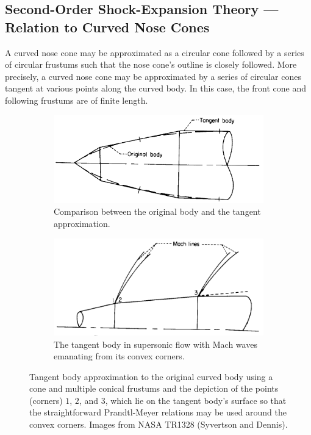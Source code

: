 \documentclass[11pt,dvipsnames]{thesis}
\begin{document}



\subsection{Second-Order Shock-Expansion Theory --- Relation to Curved Nose Cones}
A curved nose cone may be approximated as a circular cone followed by a series of circular frustums such that the nose cone's outline is closely followed. More precisely, a curved nose cone may be approximated by a series of circular cones tangent at various points along the curved body. In this case, the front cone and following frustums are of finite length. 
\begin{figure}[H]
  \centering
  \begin{subfigure}[b]{0.49\linewidth}
    \includegraphics[width=\linewidth]{ASecondOrderShockExpansionMethodOriginalBody}
    \caption{Comparison between the original body and the tangent approximation.}
    \label{fig:AerodynamicsSecondOrderOriginalBody}
  \end{subfigure}
  \begin{subfigure}[b]{0.49\linewidth}
    \includegraphics[width=\linewidth]{ASecondOrderShockExpansionMethodTangentBody}
    \caption{The tangent body in supersonic flow with Mach waves emanating from its convex corners.}
    \label{fig:AerodynamicsSecondOrderTangentBody}
  \end{subfigure}
  \caption{Tangent body approximation to the original curved body using a cone and multiple conical frustums and the depiction of the points (corners) $1$, $2$, and $3$, which lie on the tangent body's surface so that the straightforward Prandtl-Meyer relations may be used around the convex corners. Images from NASA TR1328 (Syvertson and Dennis).}
  \label{fig:AerodynamicsSecondOrderBodies}
\end{figure}
\end{document}
